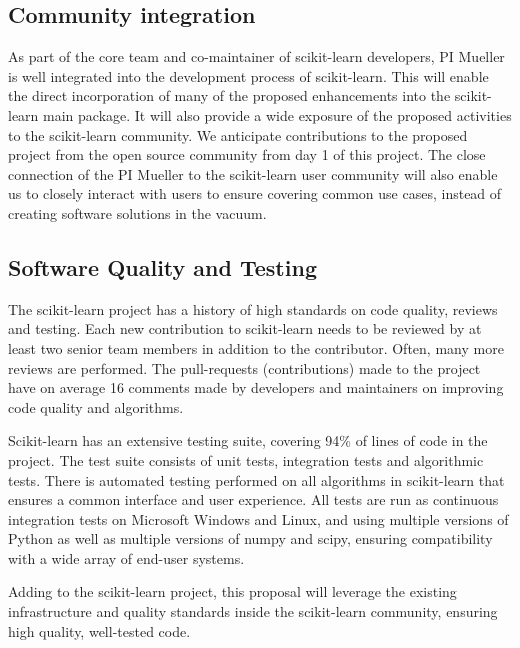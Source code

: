 \subsection{Community integration}
As part of the core team and co-maintainer of scikit-learn developers, PI
Mueller is well integrated into the development process of scikit-learn.
This will enable the direct incorporation of many of the proposed enhancements
into the scikit-learn main package.
It will also provide a wide exposure of the proposed activities to the
scikit-learn community. We anticipate contributions to the proposed
project from the open source community from day 1 of this project.
The close connection of the PI Mueller to the scikit-learn user community will
also enable us to closely interact with users to ensure covering common use cases,
instead of creating software solutions in the vacuum.

\subsection{Software Quality and Testing}
The scikit-learn project has a history of high standards on code quality, reviews and testing.
Each new contribution to scikit-learn needs to be reviewed by at least two senior team members
in addition to the contributor. Often, many more reviews are performed. The
pull-requests (contributions) made to the project have on average 16 comments
made by developers and maintainers on improving code quality and algorithms.

Scikit-learn has an extensive testing suite, covering 94\% of lines of code in the project.
The test suite consists of unit tests, integration tests and algorithmic tests.
There is automated testing performed on all algorithms in scikit-learn that ensures a common
interface and user experience.
All tests are run as continuous integration tests on Microsoft Windows and Linux, and using
multiple versions of Python as well as multiple versions of numpy and scipy, ensuring
compatibility with a wide array of end-user systems.

Adding to the scikit-learn project, this proposal will leverage the existing infrastructure
and quality standards inside the scikit-learn community, ensuring high quality, well-tested code.

